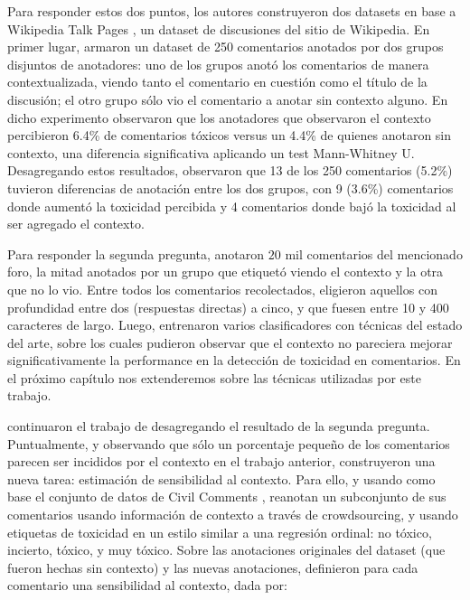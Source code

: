 Para responder estos dos puntos, los autores construyeron dos datasets en base a Wikipedia Talk Pages \cite{hua-etal-2018-wikiconv}, un dataset de discusiones del sitio de Wikipedia. En primer lugar, armaron un dataset de 250 comentarios anotados por dos grupos disjuntos de anotadores: uno de los grupos anotó los comentarios de manera contextualizada, viendo tanto el comentario en cuestión como el título de la discusión; el otro grupo sólo vio el comentario a anotar sin contexto alguno. En dicho experimento observaron que los anotadores que observaron el contexto percibieron 6.4\% de comentarios tóxicos versus un 4.4\% de quienes anotaron sin contexto, una diferencia significativa aplicando un test Mann-Whitney U. Desagregando estos resultados, observaron que 13 de los 250 comentarios (5.2\%) tuvieron diferencias de anotación entre los dos grupos, con 9 (3.6\%) comentarios donde aumentó la toxicidad percibida y 4 comentarios donde bajó la toxicidad al ser agregado el contexto.

Para responder la segunda pregunta, anotaron $20$ mil comentarios del mencionado foro, la mitad anotados por un grupo que etiquetó viendo el contexto y la otra que no lo vio. Entre todos los comentarios recolectados, eligieron aquellos con profundidad entre dos (respuestas directas) a cinco, y que fuesen entre 10 y 400 caracteres de largo. Luego, entrenaron varios clasificadores con técnicas del estado del arte, sobre los cuales pudieron observar que el contexto no pareciera mejorar significativamente la performance en la detección de toxicidad en comentarios. En el próximo capítulo nos extenderemos sobre las técnicas utilizadas por este trabajo.

\citet{xenos-2021-context} continuaron el trabajo de \citet{pavlopoulos2020toxicity} desagregando el resultado de la segunda pregunta. Puntualmente, y observando que sólo un porcentaje pequeño de los comentarios parecen ser incididos por el contexto en el trabajo anterior, construyeron una nueva tarea: estimación de sensibilidad al contexto. Para ello, y usando como base el conjunto de datos de Civil Comments \cite{borkan2019civil}, reanotan un subconjunto de sus comentarios usando información de contexto a través de crowdsourcing, y usando etiquetas de toxicidad en un estilo similar a una regresión ordinal: no tóxico, incierto, tóxico, y muy tóxico. Sobre las anotaciones originales del dataset (que fueron hechas sin contexto) y las nuevas anotaciones, definieron para cada comentario una sensibilidad al contexto, dada por:

